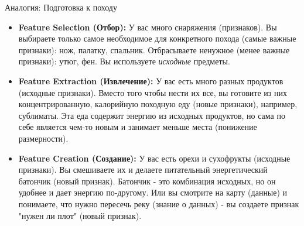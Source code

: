\begin{myexampleblock}{Аналогия: Подготовка к походу}
    \begin{itemize}
        \item \textbf{Feature Selection (Отбор):} У вас много снаряжения (признаков). Вы выбираете только самое необходимое для конкретного похода (самые важные признаки): нож, палатку, спальник. Отбрасываете ненужное (менее важные признаки): утюг, фен. Вы используете \textit{исходные} предметы.
        \item \textbf{Feature Extraction (Извлечение):} У вас есть много разных продуктов (исходные признаки). Вместо того чтобы нести их все, вы готовите из них концентрированную, калорийную походную еду (новые признаки), например, сублиматы. Эта еда содержит энергию из исходных продуктов, но сама по себе является чем-то новым и занимает меньше места (понижение размерности).
        \item \textbf{Feature Creation (Создание):} У вас есть орехи и сухофрукты (исходные признаки). Вы смешиваете их и делаете питательный энергетический батончик (новый признак). Батончик - это комбинация исходных, но он удобнее и дает энергию по-другому. Или вы смотрите на карту (данные) и понимаете, что нужно пересечь реку (знание о данных) - вы создаете признак "нужен ли плот" (новый признак).
    \end{itemize}
\end{myexampleblock}

